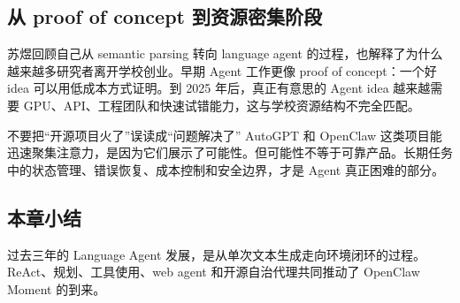 \subsection{从 proof of concept 到资源密集阶段}

苏煜回顾自己从 semantic parsing 转向 language agent 的过程，也解释了为什么越来越多研究者离开学校创业。早期 Agent 工作更像 proof of concept：一个好 idea 可以用低成本方式证明。到 2025 年后，真正有意思的 Agent idea 越来越需要 GPU、API、工程团队和快速试错能力，这与学校资源结构不完全匹配。

\begin{warningbox}{不要把“开源项目火了”误读成“问题解决了”}
AutoGPT 和 OpenClaw 这类项目能迅速聚集注意力，是因为它们展示了可能性。但可能性不等于可靠产品。长期任务中的状态管理、错误恢复、成本控制和安全边界，才是 Agent 真正困难的部分。
\end{warningbox}

\subsection{本章小结}

过去三年的 Language Agent 发展，是从单次文本生成走向环境闭环的过程。ReAct、规划、工具使用、web agent 和开源自治代理共同推动了 OpenClaw Moment 的到来。

